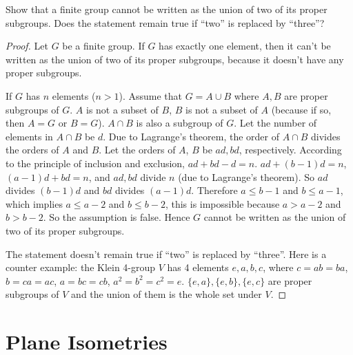 \newpage
\begin{exercise}
    Show that a finite group cannot be written as the union of two of its proper subgroups. Does the statement remain true if ``two'' is replaced by ``three''?
\end{exercise}

\begin{proof}
    Let $G$ be a finite group. If $G$ has exactly one element, then it can't be written as the union of two of its proper subgroups, because it doesn't have any proper subgroups.

    If $G$ has $n$ elements ($n > 1$). Assume that $G = A\cup B$ where $A, B$ are proper subgroups of $G$. $A$ is not a subset of $B$, $B$ is not a subset of $A$ (because if so, then $A = G$ or $B = G$). $A\cap B$ is also a subgroup of $G$. Let the number of elements in $A\cap B$ be $d$. Due to Lagrange's theorem, the order of $A\cap B$ divides the orders of $A$ and $B$. Let the orders of $A$, $B$ be $ad, bd$, respectively. According to the principle of inclusion and exclusion, $ad + bd - d = n$. $ad + (b-1)d = n$, $(a-1)d + bd = n$, and $ad, bd$ divide $n$ (due to Lagrange's theorem). So $ad$ divides $(b - 1)d$ and $bd$ divides $(a - 1)d$. Therefore $a\leq b - 1$ and $b\leq a - 1$, which implies $a\leq a - 2$ and $b\leq b - 2$, this is impossible because $a > a - 2$ and $b > b - 2$. So the assumption is false. Hence $G$ cannot be written as the union of two of its proper subgroups.

    The statement doesn't remain true if ``two'' is replaced by ``three''. Here is a counter example: the Klein 4-group $V$ has 4 elements $e, a, b, c$, where $c = ab = ba$, $b = ca = ac$, $a = bc = cb$, $a^{2} = b^{2} = c^{2} = e$. $\{e, a\}, \{e, b\}, \{e, c\}$ are proper subgroups of $V$ and the union of them is the whole set under $V$.
\end{proof}

\newpage
\section{Plane Isometries}
